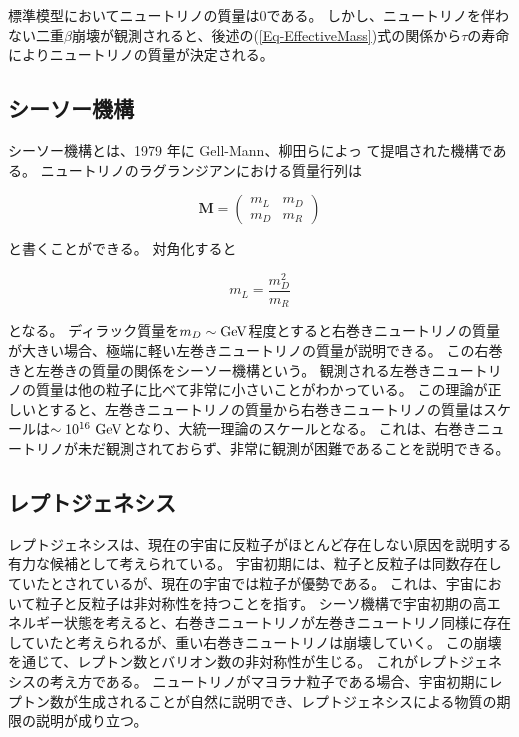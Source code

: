 \documentclass[a4paper,10pt]{jreport}
\begin{document}
標準模型においてニュートリノの質量は0である。
しかし、ニュートリノを伴わない二重$\beta$崩壊が観測されると、後述の(\ref{Eq-EffectiveMass})式の関係から$\tau$の寿命によりニュートリノの質量が決定される。




\subsection{シーソー機構}

シーソー機構とは、1979 年に Gell-Mann、柳田らによっ て提唱された機構である。
ニュートリノのラグランジアンにおける質量行列は

\begin{equation} \label{Eq-MassMatrix}
	\bm{M} =
	\left(
		\begin{array}{cc}
		m_L & m_D \\
		m_D & m_R
		\end{array}
	\right)
\end{equation}

と書くことができる。
対角化すると

\begin{equation} \label{Eq-Seesaw}
	m_L=\frac{m_D^2}{m_R}
\end{equation}

となる。
ディラック質量を$m_D\sim\rm{GeV}$程度とすると右巻きニュートリノの質量が大きい場合、極端に軽い左巻きニュートリノの質量が説明できる。
この右巻きと左巻きの質量の関係をシーソー機構という。
観測される左巻きニュートリノの質量は他の粒子に比べて非常に小さいことがわかっている。
この理論が正しいとすると、左巻きニュートリノの質量から右巻きニュートリノの質量はスケールは$\sim 10^{16}\  \rm{GeV}$となり、大統一理論のスケールとなる。
これは、右巻きニュートリノが未だ観測されておらず、非常に観測が困難であることを説明できる。




\subsection{レプトジェネシス}

レプトジェネシスは、現在の宇宙に反粒子がほとんど存在しない原因を説明する有力な候補として考えられている。
宇宙初期には、粒子と反粒子は同数存在していたとされているが、現在の宇宙では粒子が優勢である。
これは、宇宙において粒子と反粒子は非対称性を持つことを指す。
シーソ機構で宇宙初期の高エネルギー状態を考えると、右巻きニュートリノが左巻きニュートリノ同様に存在していたと考えられるが、重い右巻きニュートリノは崩壊していく。
この崩壊を通じて、レプトン数とバリオン数の非対称性が生じる。
これがレプトジェネシスの考え方である。
ニュートリノがマヨラナ粒子である場合、宇宙初期にレプトン数が生成されることが自然に説明でき、レプトジェネシスによる物質の期限の説明が成り立つ。
\end{document}
